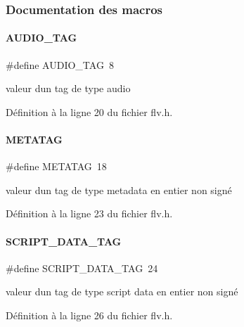 \subsubsection{Documentation des macros}
\mbox{\label{a00083_a4cbcf5c35a6328d37c6df5022eaf6379}} 
\paragraph{\texorpdfstring{A\+U\+D\+I\+O\+\_\+\+T\+AG}{AUDIO\_TAG}}
{\footnotesize\ttfamily \#define A\+U\+D\+I\+O\+\_\+\+T\+AG~8}

valeur d\textquotesingle{}un tag de type audio 

Définition à la ligne 20 du fichier flv.\+h.

\mbox{\label{a00083_ac76ca23e2d23cebc24b99842acc77b3b}} 
\paragraph{\texorpdfstring{M\+E\+T\+A\+T\+AG}{METATAG}}
{\footnotesize\ttfamily \#define M\+E\+T\+A\+T\+AG~18}

valeur d\textquotesingle{}un tag de type metadata en entier non signé 

Définition à la ligne 23 du fichier flv.\+h.

\mbox{\label{a00083_a7cbe5e145717175c153d5e59f828129a}} 
\paragraph{\texorpdfstring{S\+C\+R\+I\+P\+T\+\_\+\+D\+A\+T\+A\+\_\+\+T\+AG}{SCRIPT\_DATA\_TAG}}
{\footnotesize\ttfamily \#define S\+C\+R\+I\+P\+T\+\_\+\+D\+A\+T\+A\+\_\+\+T\+AG~24}

valeur d\textquotesingle{}un tag de type script data en entier non signé 

Définition à la ligne 26 du fichier flv.\+h.

